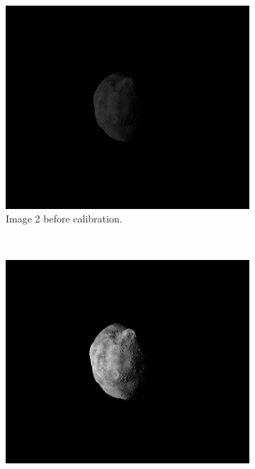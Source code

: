 \begin{figure}[htb]
\begin{subfigure}[b]{0.48\textwidth}
                \includegraphics[width=\textwidth]{doc/thesis/0_figures/rendering_lighting/SssbOnly_2017-08-15T115859-288000.jpg}
                \caption{Image 2 before calibration.}
                \label{fig:composition_before_2}
        \end{subfigure}
        \\
        \begin{subfigure}[b]{0.48\textwidth}
            \centering
                \includegraphics[width=\textwidth]{doc/thesis/0_figures/rendering_lighting/Inst_2017-08-15T115858-281000.png}

\end{subfigure}
\end{figure}
